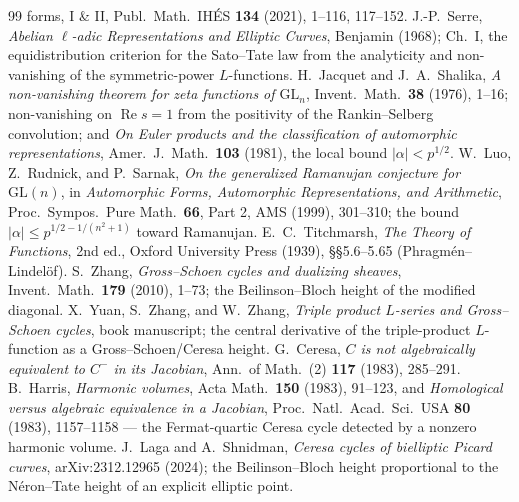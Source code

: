 \documentclass[11pt]{article}
\theoremstyle{definition}
\renewcommand{\Re}{\operatorname{Re}}
\begin{document}
\begin{thebibliography}{99}
{forms, I \& II}, Publ.\ Math.\ IH\'ES \textbf{134} (2021), 1--116, 117--152.
 J.-P.~Serre, \emph{Abelian $\ell$-adic Representations and Elliptic Curves}, Benjamin
(1968); Ch.~I, the equidistribution criterion for the Sato--Tate law from the analyticity and
non-vanishing of the symmetric-power $L$-functions.
 H.~Jacquet and J.~A.~Shalika, \emph{A non-vanishing theorem for zeta functions of
$\mathrm{GL}_n$}, Invent.\ Math.\ \textbf{38} (1976), 1--16; non-vanishing on $\Re s=1$ from the
positivity of the Rankin--Selberg convolution; and \emph{On Euler products and the classification of
automorphic representations}, Amer.\ J.\ Math.\ \textbf{103} (1981), the local bound $|\alpha|<p^{1/2}$.
 W.~Luo, Z.~Rudnick, and P.~Sarnak, \emph{On the generalized Ramanujan conjecture for
$\mathrm{GL}(n)$}, in \emph{Automorphic Forms, Automorphic Representations, and Arithmetic}, Proc.\
Sympos.\ Pure Math.\ \textbf{66}, Part 2, AMS (1999), 301--310; the bound
$|\alpha|\le p^{1/2-1/(n^2+1)}$ toward Ramanujan.
 E.~C.~Titchmarsh, \emph{The Theory of Functions}, 2nd ed., Oxford University
Press (1939), \S\S5.6--5.65 (Phragm\'en--Lindel\"of).
 S.~Zhang, \emph{Gross--Schoen cycles and dualizing sheaves}, Invent.\ Math.\
\textbf{179} (2010), 1--73; the Beilinson--Bloch height of the modified diagonal.
\bibitem{YZZ} X.~Yuan, S.~Zhang, and W.~Zhang, \emph{Triple product $L$-series and Gross--Schoen
cycles}, book manuscript; the central derivative of the triple-product $L$-function as a
Gross--Schoen/Ceresa height.
\bibitem{Ceresa} G.~Ceresa, \emph{$C$ is not algebraically equivalent to $C^-$ in its Jacobian},
Ann.\ of Math.\ (2) \textbf{117} (1983), 285--291.
\bibitem{Harris} B.~Harris, \emph{Harmonic volumes}, Acta Math.\ \textbf{150} (1983), 91--123, and
\emph{Homological versus algebraic equivalence in a Jacobian}, Proc.\ Natl.\ Acad.\ Sci.\ USA
\textbf{80} (1983), 1157--1158 --- the Fermat-quartic Ceresa cycle detected by a nonzero harmonic volume.
\bibitem{LagaShnidman} J.~Laga and A.~Shnidman, \emph{Ceresa cycles of bielliptic Picard curves},
arXiv:2312.12965 (2024); the Beilinson--Bloch height proportional to the N\'eron--Tate height of an
explicit elliptic point.
\end{thebibliography}
\end{document}
